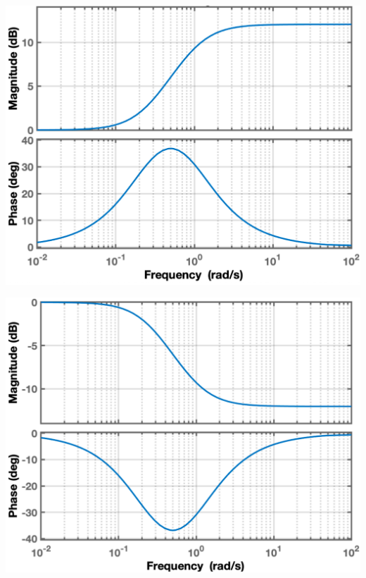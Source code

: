 \begin{minipage}[c]{0.48\columnwidth}
    \begin{center}
    \end{center}
    \includegraphics[width=\columnwidth]{images/bode_lead-glied.png}
\end{minipage}
\hfill
\begin{minipage}[c]{0.48\columnwidth}
    \begin{center}
    \end{center}
    \includegraphics[width=\columnwidth]{images/bode_lag_glied.png}
\end{minipage}

